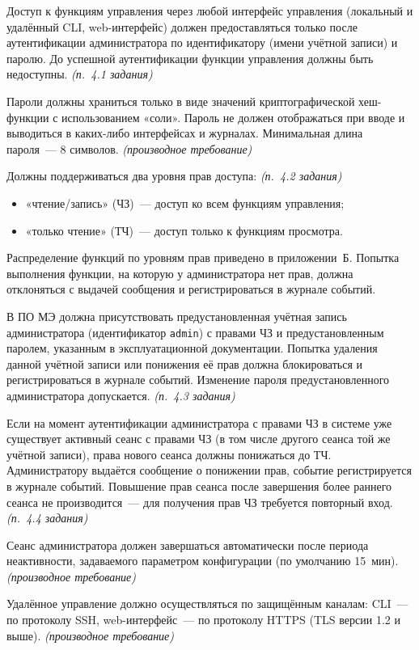 \documentclass[12pt,a4paper,final]{article}
\newenvironment{reqs}
  {\begin{description}[style=sameline,leftmargin=2.2cm,labelwidth=2.0cm,
     labelsep=0.2cm,font=\normalfont\bfseries,itemsep=3pt]}
  {\end{description}}
\newcommand{\src}[1]{\textit{(п.~#1 задания)}}
\newcommand{\der}{\textit{(производное требование)}}
\begin{document}
\begin{reqs}
\item[ДСТ-01] Доступ к функциям управления через любой интерфейс управления
  (локальный и удалённый CLI, web-интерфейс) должен предоставляться только после
  аутентификации администратора по идентификатору (имени учётной записи) и паролю.
  До успешной аутентификации функции управления должны быть недоступны. \src{4.1}
\item[ДСТ-02] Пароли должны храниться только в виде значений криптографической
  хеш-функции с использованием «соли». Пароль не должен отображаться при вводе
  и выводиться в каких-либо интерфейсах и журналах. Минимальная длина пароля~—
  8 символов. \der
\item[ДСТ-03] Должны поддерживаться два уровня прав доступа: \src{4.2}
  \begin{itemize}
  \item «чтение/запись» (ЧЗ)~— доступ ко всем функциям управления;
  \item «только чтение» (ТЧ)~— доступ только к функциям просмотра.
  \end{itemize}
  Распределение функций по уровням прав приведено в приложении~Б. Попытка
  выполнения функции, на которую у администратора нет прав, должна отклоняться
  с выдачей сообщения и регистрироваться в журнале событий.
\item[ДСТ-04] В ПО МЭ должна присутствовать предустановленная учётная запись
  администратора (идентификатор \texttt{admin}) с правами ЧЗ и предустановленным
  паролем, указанным в эксплуатационной документации. Попытка удаления данной
  учётной записи или понижения её прав должна блокироваться и регистрироваться
  в журнале событий. Изменение пароля предустановленного администратора
  допускается. \src{4.3}
\item[ДСТ-05] Если на момент аутентификации администратора с правами ЧЗ в системе
  уже существует активный сеанс с правами ЧЗ (в том числе другого сеанса той же
  учётной записи), права нового сеанса должны понижаться до ТЧ. Администратору
  выдаётся сообщение о понижении прав, событие регистрируется в журнале событий.
  Повышение прав сеанса после завершения более раннего сеанса не производится~—
  для получения прав ЧЗ требуется повторный вход. \src{4.4}
\item[ДСТ-06] Сеанс администратора должен завершаться автоматически после периода
  неактивности, задаваемого параметром конфигурации (по умолчанию 15~мин). \der
\item[ДСТ-07] Удалённое управление должно осуществляться по защищённым каналам:
  CLI~— по протоколу SSH, web-интерфейс~— по протоколу HTTPS (TLS версии 1.2 и выше). \der
\end{reqs}
\end{document}
